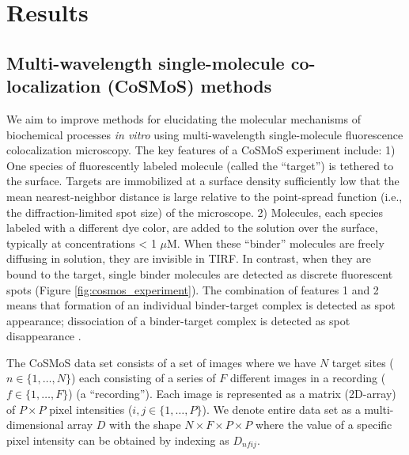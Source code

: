 \section{Results}

\subsection{Multi-wavelength single-molecule co-localization (CoSMoS) methods}

We aim to improve methods for elucidating the molecular mechanisms of biochemical processes \textit{in vitro} using multi-wavelength single-molecule fluorescence colocalization microscopy. The key features of a CoSMoS experiment include: 1) One species of fluorescently labeled molecule (called the “target”) is tethered to the surface. Targets are immobilized at a surface density sufficiently low that the mean nearest-neighbor distance is large relative to the point-spread function (i.e., the diffraction-limited spot size) of the microscope.
2) Molecules, each species labeled with a different dye color, are added to the solution over the surface, typically at concentrations < 1 $\mu$M. When these “binder” molecules are freely diffusing in solution, they are invisible in TIRF. In contrast, when they are bound to the target, single binder molecules are detected as discrete fluorescent spots (Figure \ref{fig:cosmos_experiment}). The combination of features 1 and 2 means that formation of an individual binder-target complex is detected as spot appearance; dissociation of a binder-target complex is detected as spot disappearance \citep{Friedman2006-kb, Friedman2015-nx}.

The CoSMoS data set consists of a set of images where we have $N$ target sites ($n \in \{1,\dots,N\}$) each consisting of a series of $F$ different images in a recording ($f \in \{1,\dots,F\}$) (a “recording”). Each image is represented as a matrix (2D-array) of $P \times P$ pixel intensities ($i,j \in \{1,\dots,P\}$). We denote entire data set as a multi-dimensional array $D$ with the shape $N \times F \times P \times P$ where the value of a specific pixel intensity can be obtained by indexing as $D_{nfij}$. 

